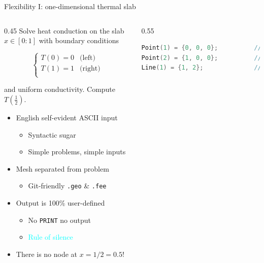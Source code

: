 \documentclass[
  ignorenonframetext,
  aspectratio=169,
]{beamer}
\newcommand{\passthrough}[1]{#1}
\providecommand{\tightlist}{%
  \setlength{\itemsep}{0pt}\setlength{\parskip}{0pt}}
\begin{document}
\begin{frame}[fragile]{Flexibility I: one-dimensional thermal slab}
\protect\hypertarget{flexibility-i-one-dimensional-thermal-slab}{}
\begin{columns}[T]
\begin{column}{0.45\textwidth}
Solve heat conduction on the slab \(x \in [0:1]\) with boundary
conditions

\[
\begin{cases}
T(0) = 0 & \text{(left)} \\
T(1) = 1 & \text{(right)} \\
\end{cases}
\]

\noindent and uniform conductivity. Compute
\(T\left(\frac{1}{2}\right)\).

\pause

\begin{itemize}
\tightlist
\item
  English self-evident ASCII input

  \begin{itemize}
  \tightlist
  \item
    Syntactic sugar
  \item
    Simple problems, simple inputs
  \end{itemize}
\item
  Mesh separated from problem

  \begin{itemize}
  \tightlist
  \item
    Git-friendly \passthrough{\lstinline!.geo!} \&
    \passthrough{\lstinline!.fee!}
  \end{itemize}
\item
  Output is 100\% user-defined

  \begin{itemize}
  \item
    No \passthrough{\lstinline!PRINT!} no output
  \item
    {\textcolor{cyan}{Rule of {silence}}}
  \end{itemize}
\item
  There is no node at \(x=1/2=0.5\)!
\end{itemize}
\end{column}

\begin{column}{0.55\textwidth}
\begin{lstlisting}[language=C, style=c]
Point(1) = {0, 0, 0};          // geometry: 
Point(2) = {1, 0, 0};          // two points
Line(1) = {1, 2};              // and a line connecting them!


\end{lstlisting}
\end{column}
\end{columns}
\end{frame}
\end{document}
